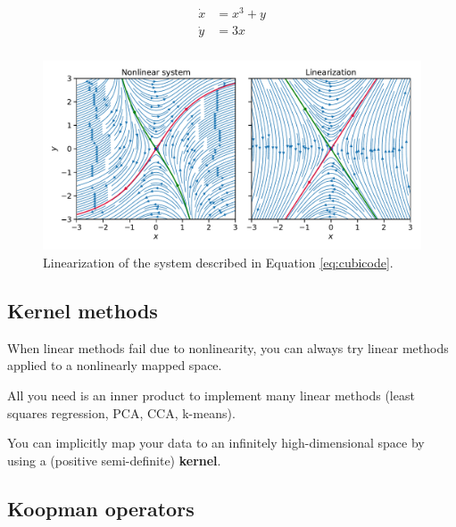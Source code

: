 \documentclass[a4paper,11pt]{exam}
\newcounter{ct}
\begin{document}
\begin{questions}
\begin{align}\label{eq:cubicode}
\begin{split}
\dot x &= x^3 + y\\
\dot y &= 3x \\
\end{split}
\end{align}

\begin{figure}[h]
    \centering
    \includegraphics[width=\textwidth]{figs/linearization.pdf}
    \caption{Linearization of the system described in Equation \ref{eq:cubicode}.}
    \label{fig:linearization}
\end{figure}

\subsection{Kernel methods}
When linear methods fail due to nonlinearity, you can always try linear methods applied to a nonlinearly mapped space.

All you need is an inner product to implement many linear methods (least squares regression, PCA, CCA, k-means).

\begin{tcolorbox}[colback=black!1!,title=Kernel Trick]
You can implicitly map your data to an infinitely high-dimensional space by using a (positive semi-definite) \textbf{kernel}.
\end{tcolorbox}

\subsection{Koopman operators}

\end{questions}



\end{document}
